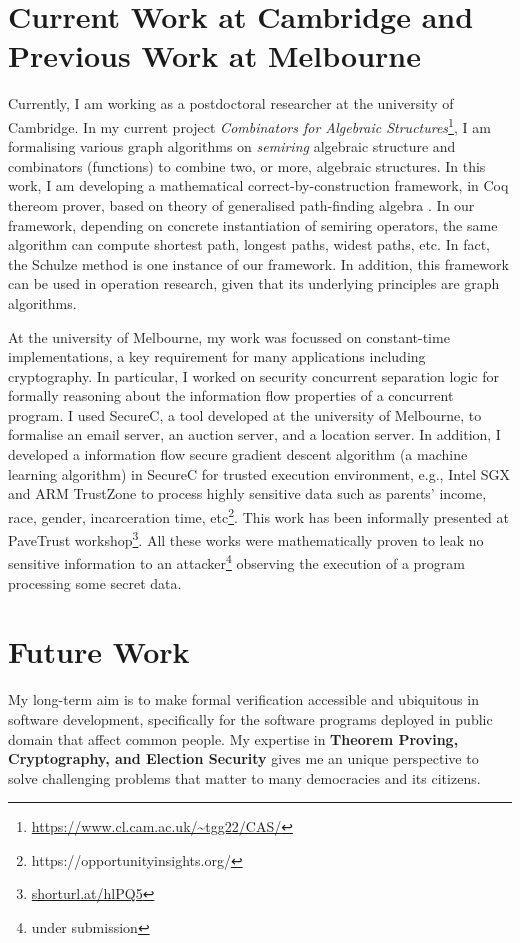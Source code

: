 \documentclass[a4paper]{article}
\begin{document}
\section{Current Work at Cambridge and Previous Work at Melbourne}
Currently, I am working as a postdoctoral researcher at the university of Cambridge. 
In my current project \emph{Combinators for Algebraic Structures}\footnote{\url{https://www.cl.cam.ac.uk/~tgg22/CAS/}}, 
I am formalising various graph algorithms on \emph{semiring} algebraic 
structure and combinators (functions) to 
combine two, or more, algebraic structures. In this work, I am developing 
a mathematical correct-by-construction \cite{10.1007/978-3-319-66107-0_26} 
framework, in Coq thereom prover, based on theory of generalised 
path-finding algebra \cite{10.1093/imamat/15.2.161, 10.1145/1080091.1080094}. 
In our framework, depending on concrete instantiation 
of semiring operators, the same algorithm can compute shortest path, longest paths, 
widest paths, etc. In fact, the Schulze method is one instance of our framework. 
In addition, this framework can be used in operation
research, given that its underlying principles are graph algorithms. 


At the university of Melbourne, my work was focussed on constant-time implementations, 
a key requirement for many applications including cryptography. 
In particular, I worked on security concurrent separation logic for formally reasoning about 
the information flow properties of a concurrent program. 
I used SecureC, a tool developed at the university of Melbourne, to formalise an email server, 
an auction server, and a location server. 
In addition, I developed a information flow secure gradient descent algorithm (a machine learning 
algorithm) in SecureC for 
trusted execution environment, e.g., Intel SGX and ARM TrustZone to process highly sensitive 
data such as parents' income, race, gender, incarceration time, etc\footnote{https://opportunityinsights.org/}.
This work has been informally presented at PaveTrust workshop\footnote{\url{shorturl.at/hlPQ5}}.
All these works were mathematically proven to leak no sensitive 
information to an attacker\footnote{under submission} observing the execution of a program processing 
some secret data.


\section{Future Work}
My long-term aim is to make formal verification accessible and ubiquitous in 
software development, specifically for the software programs deployed in public domain
that affect common people.
My expertise in \textbf{Theorem Proving, Cryptography, and Election Security}
gives me an unique perspective to solve challenging problems that matter to many democracies 
and its citizens. 
\end{document}
